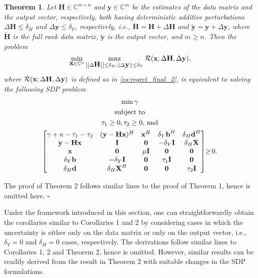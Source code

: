 \documentclass[review,sort&compress]{elsarticle}
\newtheorem{thm}{Theorem}
\renewcommand{\vec}[1]{\mbox{$\mathbf{#1}$}}
\newcommand{\norm}[1]{\left|\left|#1\right|\right|}
\newcommand{\nn}{\nonumber}
\newcommand{\C}{\mathbb{C}}
\newcommand{\R}{{\cal R}}
\newcommand{\vH}{\vec{H}}
\newcommand{\vx}{\vec{x}}
\newcommand{\vy}{\vec{y}}
\newcommand{\dH}{\Delta\vH}
\newcommand{\dy}{\Delta\vy}
\newcommand{\tH}{\tilde{\vec{H}}}
\newcommand{\ty}{\tilde{\vec{y}}}
\newcommand{\vd}{\vec{d}}
\newcommand{\vX}{\vec{X}}
\newcommand{\vI}{\vec{I}}
\newcommand{\vb}{\vec{b}}
\begin{document}
\begin{thm}\label{thm2}
Let $\vH \in \C^{m\times n}$ and $\vy \in \C^{m}$ be the estimates of the data matrix and the output vector, respectively, both having deterministic additive perturbations $\dH \leq \delta_H$ and $\dy \leq \delta_Y$, respectively, i.e., $\tH=\vH+\dH$ and $\ty=\vy+\dy$, where $\tH$ is the full rank data matrix, $\ty$ is the output vector, and $m \geq n$. Then the problem
\begin{equation}\label{eq:prudefthm2}
  \min_{\vx \in \C^n} \max_{\norm{\dH} \leq \delta_H,\norm{\dy} \leq \delta_Y} \R(\vx; \dH,\dy),
\end{equation}
where $\R(\vx; \dH,\dy)$ is defined as in \eqref{eq:regret_final_2}, is equivalent to solving the following SDP problem
\begin{gather}
  \min \gamma \nn\\
  \mbox{subject to} \nn\\
  \tau_1 \geq 0, \tau_2 \geq 0 \text{, and} \nn\\
  \begin{bmatrix}
  \gamma + \kappa - \tau_1 - \tau_2 & (\vy-\vH\vx)^H & \vx^H   & \delta_Y \vb^H  & \delta_H\vd^H \\
  \vy-\vH\vx                        & \vI            & \vec{0} & -\delta_Y\vI    & \delta_H\vX \\
  \vx                               & \vec{0}        & \mu \vI & \vec{0}         & \vec{0} \\
  \delta_Y \vb                      & -\delta_Y\vI   & \vec{0} & \tau_1 \vI      & \vec{0} \\
  \delta_H\vd                       & \delta_H\vX^H  & \vec{0} & \vec{0}         & \tau_2 \vI
  \end{bmatrix} \hspace{-0.1cm} \geq \hspace{-0.05cm} 0.
\end{gather}
\end{thm}

\begin{pot2}
The proof of Theorem 2 follows similar lines to the proof of Theorem 1, hence is omitted here. \hfill $\square$
\end{pot2}

\begin{rmk}
Under the framework introduced in this section, one can straightforwardly obtain the corollaries similar to Corollaries 1 and 2 by considering cases in which the uncertainty is either only on the data matrix or only on the output vector, i.e., $\delta_Y = 0$ and $\delta_H = 0$ cases, respectively. The derivations follow similar lines to Corollaries 1, 2 and Theorem 2, hence is omitted. However, similar results can be readily derived from the result in Theorem 2 with suitable changes in the SDP formulations.
\end{rmk}
\end{document}
